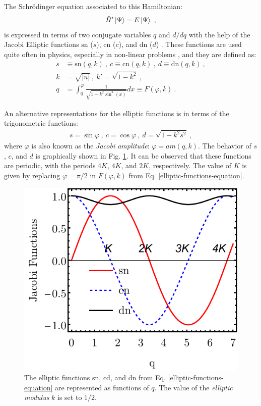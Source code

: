 The Schrödinger equation associated to this Hamiltonian:
\begin{align}
    \hat{H}'\ket{\Psi}=E\ket{\Psi}\ ,
\end{align}
is expressed in terms of two conjugate variables $q$ and $d/dq$ with the help of the Jacobi Elliptic functions $\text{sn}$ ($s$), $\text{cn}$ ($c$), and $\text{dn}$ ($d$) \cite{jacobi1829fundamenta,akhiezer1990elements}. These functions are used quite often in physics, especially in non-linear problems \cite{kovacic2016jacobi}, and they are defined as:
\begin{align}
    s&\equiv\text{sn}(q,k)\ ,\ c\equiv\text{cn}(q,k)\ ,\ d\equiv\text{dn}(q,k)\ ,\nonumber\\
    k&=\sqrt{|u|}\ ,\ k'=\sqrt{1-k^2}\ ,\nonumber\\
    q&=\int_0^\varphi \frac{1}{\sqrt{1-k^2\sin^2(x)}}dx\equiv F(\varphi,k)\ .
    \label{elliptic-functions-equation}
\end{align}

An alternative representations for the elliptic functions is in terms of the trigonometric functions:
\begin{align}
    s=\sin\varphi\ ,\ c=\cos\varphi\ ,\ d=\sqrt{1-k^2s^2}\ ,
\end{align}
where $\varphi$ is also known as the \emph{Jacobi amplitude}: $\varphi=am(q,k)$. The behavior of $s$, $c$, and $d$ is graphically shown in Fig. \ref{elliptic-functions-plot}. It can be observed that these functions are periodic, with the periods $4K$, $4K$, and $2K$, respectively. The value of $K$ is given by replacing $\varphi=\pi/2$ in $F(\varphi,k)$ from Eq. \ref{elliptic-functions-equation}.
\begin{figure}
    \centering
    \includegraphics[scale=0.9]{Chapters/Figures/Jacobi-Elliptic-Functions.pdf}
    \caption{The elliptic functions sn, cd, and dn from Eq. \ref{elliptic-functions-equation} are represented as functions of $q$. The value of the \emph{elliptic modulus} $k$ is set to $1/2$.}
    \label{elliptic-functions-plot}
\end{figure}

